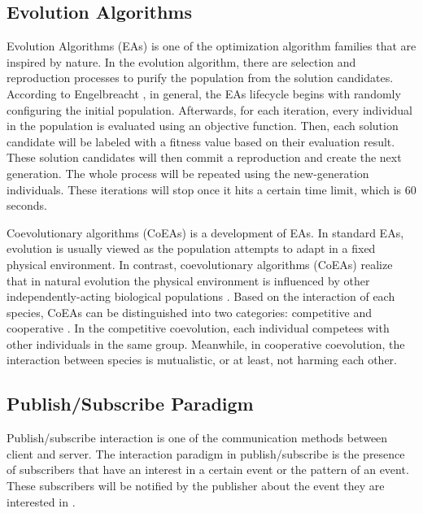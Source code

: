 \documentclass[conference]{IEEEtran}
\begin{document}
\subsection{Evolution Algorithms}
\label{ssec:evolution-algorithms}
Evolution Algorithms (EAs) is one of the optimization algorithm families that are inspired by nature. In the evolution algorithm, there are selection and reproduction processes to purify the population from the solution candidates. According to Engelbreacht \cite{engelbrecht_coevolution_2007}, in general, the EAs lifecycle begins with randomly configuring the initial population. Afterwards, for each iteration, every individual in the population is evaluated using an objective function. Then, each solution candidate will be labeled with a fitness value based on their evaluation result. These solution candidates will then commit a reproduction and create the next generation. The whole process will be repeated using the new-generation individuals. These iterations will stop once it hits a certain time limit, which is 60 seconds. 


Coevolutionary algorithms (CoEAs) is a development of EAs. In standard EAs, evolution is usually viewed as the population attempts to adapt in a fixed physical environment. In contrast, coevolutionary algorithms (CoEAs) realize that in natural evolution the physical environment is influenced by other independently-acting biological populations \cite{engelbrecht_coevolution_2007}. Based on the interaction of each species, CoEAs can be distinguished into two categories: competitive and cooperative \cite{engelbrecht_coevolution_2007}. In the competitive coevolution, each individual competees with other individuals in the same group. Meanwhile, in cooperative coevolution, the interaction between species is mutualistic, or at least, not harming each other. 


\subsection{Publish/Subscribe Paradigm}
\label{ssec:pub-sub}
Publish/subscribe interaction is one of the communication methods between client and server. The interaction paradigm in publish/subscribe is the presence of subscribers that have an interest in a certain event or the pattern of an event. These subscribers will be notified by the publisher about the event they are interested in \cite{eugster_many_2003}. 
\end{document}
